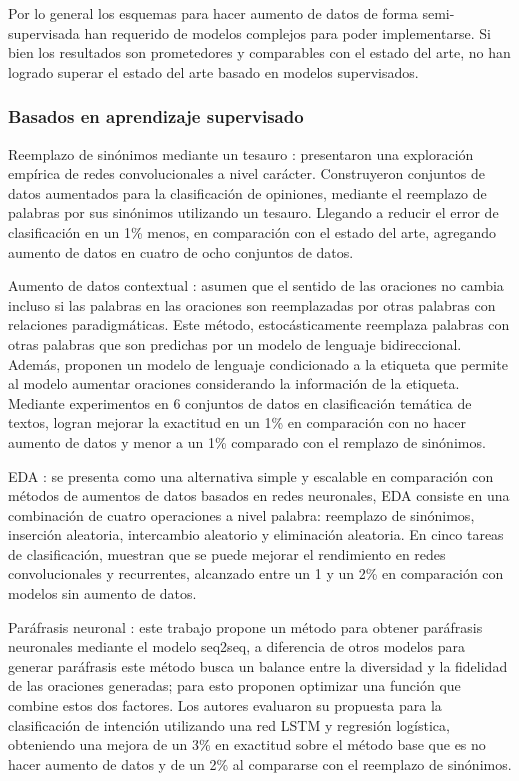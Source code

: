 Por lo general los esquemas para hacer aumento de datos de forma semi-supervisada han requerido de modelos complejos para poder implementarse. Si bien los resultados son prometedores y comparables con el estado del arte, no han logrado superar el estado del arte basado en modelos supervisados.

\subsubsection{Basados en aprendizaje supervisado}

Reemplazo de sinónimos mediante un tesauro \citep{zhang2015character}: presentaron una exploración empírica de redes convolucionales a nivel carácter. Construyeron conjuntos de datos aumentados para la clasificación de opiniones, mediante el reemplazo de palabras por sus sinónimos utilizando un tesauro. Llegando a reducir el error de clasificación en un 1\% menos, en comparación con el estado del arte, agregando aumento de datos en cuatro de ocho conjuntos de datos.

Aumento de datos contextual \citep{kobayashi2018contextual}: asumen que el sentido de las oraciones no cambia incluso si las palabras en las oraciones son reemplazadas por otras palabras con relaciones paradigmáticas. Este método, estocásticamente reemplaza palabras con otras palabras que son predichas por un modelo de lenguaje bidireccional. Además, proponen un modelo de lenguaje condicionado a la etiqueta que permite al modelo aumentar oraciones considerando la información de la etiqueta. Mediante experimentos en 6 conjuntos de datos en clasificación temática de textos, logran mejorar la exactitud en un 1\% en comparación con no hacer aumento de datos y menor a un 1\% comparado con el remplazo de sinónimos.

EDA \citep{wei2019eda}: se presenta como una alternativa simple y escalable en comparación con métodos de aumentos de datos basados en redes neuronales, EDA consiste en una combinación de cuatro operaciones a nivel palabra: reemplazo de sinónimos, inserción aleatoria, intercambio aleatorio y eliminación aleatoria. En cinco tareas de clasificación, muestran que se puede mejorar  el rendimiento en redes convolucionales y recurrentes, alcanzado entre un 1 y un 2\% en comparación con modelos sin aumento de datos.

Paráfrasis neuronal \citep{kumar2019submodular}: este trabajo propone un método para obtener paráfrasis neuronales mediante el modelo seq2seq, a diferencia de otros modelos para generar paráfrasis este método busca un balance entre la diversidad y la fidelidad de las oraciones generadas; para esto proponen optimizar una función que combine estos dos factores. Los autores evaluaron su propuesta para la clasificación de intención utilizando una red LSTM y regresión logística, obteniendo una mejora de un 3\% en exactitud sobre el método base que es no hacer aumento de datos y de un 2\% al compararse con el reemplazo de sinónimos.

